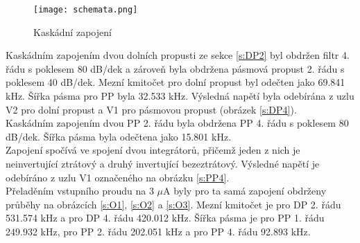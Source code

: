 \begin{figure}[h]
\centering
\texttt{[image: schemata.png]}
\caption[Kaskádní zapojení]{Kaskádní zapojení \cite{12}}
\end{figure}
Kaskádním zapojením dvou dolních propusti ze sekce \ref{s:DP2} byl obdržen filtr 4. řádu s poklesem 80 dB/dek a zároveň byla obdržena pásmová propust 2. řádu s poklesem 40 dB/dek. Mezní kmitočet pro dolní propust byl odečten jako 69.841 kHz. Šířka pásma pro PP byla 32.533 kHz. Výsledná napětí byla odebírána z uzlu V2 pro dolní propust a V1 pro pásmovou propust (obrázek \ref{s:DP4}). \\
\noindent Kaskádním zapojením dvou PP 2. řádu byla obdržena PP 4. řádu s poklesem 80 dB/dek. Šířka pásma byla odečtena jako 15.801 kHz.\\ Zapojení spočívá ve spojení dvou integrátorů, přičemž jeden z nich je neinvertující ztrátový a druhý invertující bezeztrátový. Výsledné napětí je odebíráno z uzlu V1 označeného na obrázku \ref{s:PP4}.\\
\noindent Přeladěním vstupního proudu na 3 $\mu$A byly pro ta samá zapojení obdrženy průběhy na obrázcích \ref{s:O1}, \ref{s:O2} a  \ref{s:O3}. Mezní kmitočet je pro DP 2. řádu 531.574 kHz a pro DP 4. řádu 420.012 kHz. Šířka pásma je pro PP 1. řádu 249.932 kHz, pro PP 2. řádu 202.051 kHz a pro PP 4. řádu 92.893 kHz.